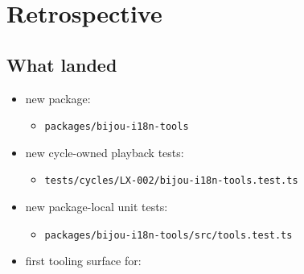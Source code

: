 \section{Retrospective}\label{record-189-retrospective}

\subsection{What landed}\label{record-189-what-landed}

\begin{itemize}
\tightlist
\item
  new package:

  \begin{itemize}
  \tightlist
  \item
    \texttt{p\allowbreak{}a\allowbreak{}c\allowbreak{}k\allowbreak{}a\allowbreak{}g\allowbreak{}e\allowbreak{}s\allowbreak{}/\allowbreak{}b\allowbreak{}i\allowbreak{}j\allowbreak{}o\allowbreak{}u\allowbreak{}-\allowbreak{}i\allowbreak{}1\allowbreak{}8\allowbreak{}n\allowbreak{}-\allowbreak{}t\allowbreak{}o\allowbreak{}o\allowbreak{}l\allowbreak{}s}
  \end{itemize}
\item
  new cycle-owned playback tests:

  \begin{itemize}
  \tightlist
  \item
    \texttt{t\allowbreak{}e\allowbreak{}s\allowbreak{}t\allowbreak{}s\allowbreak{}/\allowbreak{}c\allowbreak{}y\allowbreak{}c\allowbreak{}l\allowbreak{}e\allowbreak{}s\allowbreak{}/\allowbreak{}L\allowbreak{}X\allowbreak{}-\allowbreak{}0\allowbreak{}0\allowbreak{}2\allowbreak{}/\allowbreak{}b\allowbreak{}i\allowbreak{}j\allowbreak{}o\allowbreak{}u\allowbreak{}-\allowbreak{}i\allowbreak{}1\allowbreak{}8\allowbreak{}n\allowbreak{}-\allowbreak{}t\allowbreak{}o\allowbreak{}o\allowbreak{}l\allowbreak{}s\allowbreak{}.\allowbreak{}t\allowbreak{}e\allowbreak{}s\allowbreak{}t\allowbreak{}.\allowbreak{}t\allowbreak{}s}
  \end{itemize}
\item
  new package-local unit tests:

  \begin{itemize}
  \tightlist
  \item
    \texttt{p\allowbreak{}a\allowbreak{}c\allowbreak{}k\allowbreak{}a\allowbreak{}g\allowbreak{}e\allowbreak{}s\allowbreak{}/\allowbreak{}b\allowbreak{}i\allowbreak{}j\allowbreak{}o\allowbreak{}u\allowbreak{}-\allowbreak{}i\allowbreak{}1\allowbreak{}8\allowbreak{}n\allowbreak{}-\allowbreak{}t\allowbreak{}o\allowbreak{}o\allowbreak{}l\allowbreak{}s\allowbreak{}/\allowbreak{}s\allowbreak{}r\allowbreak{}c\allowbreak{}/\allowbreak{}t\allowbreak{}o\allowbreak{}o\allowbreak{}l\allowbreak{}s\allowbreak{}.\allowbreak{}t\allowbreak{}e\allowbreak{}s\allowbreak{}t\allowbreak{}.\allowbreak{}t\allowbreak{}s}
  \end{itemize}
\item
  first tooling surface for:


\end{itemize}
